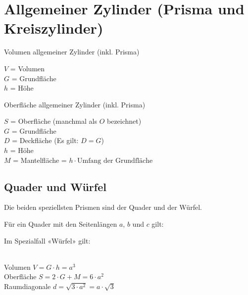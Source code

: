 \section{Allgemeiner Zylinder (Prisma und Kreiszylinder)}


\begin{gesetz}{Volumen allgemeiner Zylinder (inkl. Prisma)}{}

  $V$ = Volumen\\
  $G$ = Grundfläche\\
  $h$ = Höhe\\
  \begin{center}\end{center}
\end{gesetz}

\begin{gesetz}{Oberfläche allgemeiner Zylinder (inkl. Prisma)}{}

  $S$ = Oberfläche (manchmal als $O$ bezeichnet)\\
  $G$ = Grundfläche\\
  $D$ = Deckfläche (Es gilt: $D=G$)\\
  $h$ = Höhe\\
  $M$ = Mantelfläche = $h \cdot{} \textrm{Umfang der Grundfläche}$\\
  \begin{center}\end{center}
\end{gesetz}



\newpage
\subsection{Quader und Würfel}\label{QuaderUndWuerfel}
Die beiden speziellsten Prismen sind der Quader und der Würfel.

Für ein Quader mit den Seitenlängen $a$, $b$ und $c$ gilt:


Im Spezialfall «Würfel» gilt:
\begin{gesetz}{}{}\\
  Volumen $V = G\cdot{} h = a^3$\\
  Oberfläche $S=2\cdot{}G + M = 6\cdot{}a^2$\\
  Raumdiagonale $d = \sqrt{3\cdot{}a^2} = a\cdot{}\sqrt{3}$
\end{gesetz}

